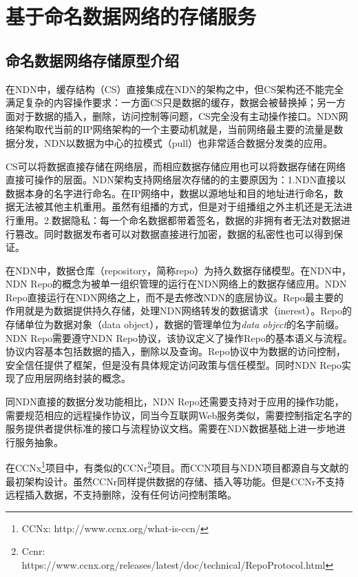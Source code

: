 

\chapter{基于命名数据网络的存储服务}
\section{命名数据网络存储原型介绍}
在NDN中，缓存结构（CS）直接集成在NDN的架构之中，但CS架构还不能完全满足复杂的内容操作要求：一方面CS只是数据的缓存，数据会被替换掉；另一方面对于数据的插入，删除，访问控制等问题，CS完全没有主动操作接口。NDN网络架构取代当前的IP网络架构的一个主要动机就是，当前网络最主要的流量是数据分发，NDN以数据为中心的拉模式（pull）也非常适合数据分发类的应用。

CS可以将数据直接存储在网络层，而相应数据存储应用也可以将数据存储在网络直接可操作的层面。NDN架构支持网络层次存储的的主要原因为：1.NDN直接以数据本身的名字进行命名。在IP网络中，数据以源地址和目的地址进行命名，数据无法被其他主机重用。虽然有组播的方式，但是对于组播组之外主机还是无法进行重用。2.数据隐私：每一个命名数据都带着签名，数据的非拥有者无法对数据进行篡改。同时数据发布者可以对数据直接进行加密，数据的私密性也可以得到保证。

在NDN中，数据仓库（repository，简称repo）为持久数据存储模型。在NDN中，NDN Repo的概念为被单一组织管理的运行在NDN网络上的数据存储应用。NDN Repo直接运行在NDN网络之上，而不是去修改NDN的底层协议。Repo最主要的作用就是为数据提供持久存储，处理NDN网络转发的数据请求（inerest）。Repo的存储单位为数据对象（data object），数据的管理单位为\textit{data object}的名字前缀。NDN Repo需要遵守NDN Repo协议，该协议定义了操作Repo的基本语义与流程。协议内容基本包括数据的插入，删除以及查询。Repo协议中为数据的访问控制，安全信任提供了框架，但是没有具体规定访问政策与信任模型。同时NDN Repo实现了应用层网络封装的概念。\cite{clark1990architectural}

同NDN直接的数据分发功能相比，NDN Repo还需要支持对于应用的操作功能，需要规范相应的远程操作协议，同当今互联网Web服务类似，需要控制指定名字的服务提供者提供标准的接口与流程协议文档。需要在NDN数据基础上进一步地进行服务抽象。

在CCNx\footnote{CCNx: http://www.ccnx.org/what-is-ccn/}项目中，有类似的CCNr\footnote{Ccnr: https://www.ccnx.org/releases/latest/doc/technical/RepoProtocol.html}项目。而CCN项目与NDN项目都源自与文献\cite{jacobson2009networking}的最初架构设计。虽然CCNr同样提供数据的存储、插入等功能。但是CCNr不支持远程插入数据，不支持删除，没有任何访问控制策略。

